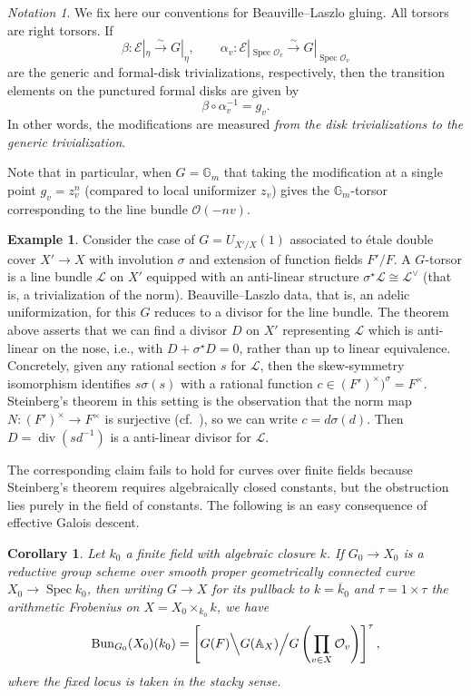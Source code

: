 \documentclass[openany]{amsbook}
\newtheorem{corollary}[theorem]{Corollary}
\theoremstyle{definition}
\newtheorem{example}[theorem]{Example}
\theoremstyle{remark}
\newtheorem{notation}[theorem]{Notation}
\numberwithin{equation}{section}
\newcommand{\G}{\mathbb{G}}
\renewcommand{\O}{\mathcal{O}}
\newcommand{\cL}{\mathcal{L}}
\newcommand{\cE}{\mathcal{E}}
\newcommand{\ol}[1]{\overline{#1}}
\renewcommand{\-}{\operatorname{-}}
\newcommand{\Spec}{\operatorname{Spec}}
\newcommand{\on}[1]{\operatorname{#1}}
\newcommand{\Bun}{\on{Bun}}
\begin{document}
\begin{notation}\label{not.BL.conventions}
    We fix here our conventions for Beauville--Laszlo gluing. All torsors are right torsors. If
    $$
        \beta : \cE|_{\eta} \xrightarrow{\sim} G|_{\eta}, \qquad \alpha_v : \cE|_{\Spec \O_v} \xrightarrow{\sim} G|_{\Spec \O_v}
    $$
    are the generic and formal-disk trivializations, respectively, then the transition elements on the punctured formal disks are given by
    $$
        \beta \circ \alpha_v^{-1} = g_v.
    $$
    In other words, the modifications are measured \emph{from the disk trivializations to the generic trivialization}. 

    Note that in particular, when $G = \G_m$ that taking the modification at a single point $g_v = z_v^n$ (compared to local uniformizer $z_v$) gives the $\G_m$-torsor corresponding to the line bundle $\O(-nv)$.
\end{notation}

\begin{example}
    Consider the case of $G = U_{X'/X}(1)$ associated to \'etale double cover $X' \to X$ with involution $\sigma$ and extension of function fields $F'/F$. A $G$-torsor is a line bundle $\cL$ on $X'$ equipped with an anti-linear structure $\sigma^\star \cL \cong \cL^{\vee}$ (that is, a trivialization of the norm). Beauville--Laszlo data, that is, an adelic uniformization, for this $G$ reduces to a divisor for the line bundle. The theorem above asserts that we can find a divisor $D$ on $X'$ representing $\cL$ which is anti-linear on the nose, i.e., with $D + \sigma^\star D = 0$, rather than up to linear equivalence. Concretely, given any rational section $s$ for $\cL$, then the skew-symmetry isomorphism identifies $s \sigma(s)$ with a rational function $c \in (F')^\times)^\sigma = F^\times$. Steinberg's theorem in this setting is the observation that the norm map $N : (F')^\times \to F^\times$ is surjective (cf.\ \cite[X.\S 7, Prop.\ 11]{serrelocfields}), so we can write $c = d \sigma(d)$. Then $D = \on{div}(sd^{-1})$ is a anti-linear divisor for $\cL$. 
\end{example}

The corresponding claim fails to hold for curves over finite fields because Steinberg's theorem requires algebraically closed constants, but the obstruction lies purely in the field of constants. The following is an easy consequence of effective Galois descent.

\begin{corollary}
    Let $k_0$ a finite field with algebraic closure $k$. If $G_0 \to X_0$ is a reductive group scheme over smooth proper geometrically connected curve $X_0 \to \Spec k_0$, then writing $G \to X$ for its pullback to $k = \ol{k}_0$ and $\tau = 1 \times \tau$ the arithmetic Frobenius on $X = X_0 \times_{k_0} k$, we have
    $$
        \Bun_{G_0}(X_0)(k_0) = \left[G(F) \Big\backslash G(\mathbb{A}_{X})\Big/G\left(\prod_{v\in X} \O_{v}\right)\right]^\tau,
    $$
    where the fixed locus is taken in the stacky sense.
\end{corollary}
\end{document}
